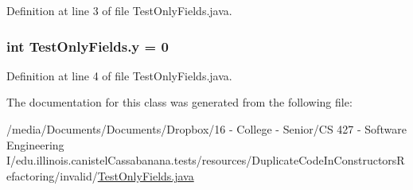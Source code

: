 Definition at line 3 of file TestOnlyFields.java.

\hypertarget{classTestOnlyFields_a0de494a2542663d26451138724b0e0ac}{
\subsubsection[{y}]{\setlength{\rightskip}{0pt plus 5cm}int {\bf TestOnlyFields.y} = 0}}
\label{classTestOnlyFields_a0de494a2542663d26451138724b0e0ac}


Definition at line 4 of file TestOnlyFields.java.



The documentation for this class was generated from the following file:\begin{DoxyCompactItemize}
\item 
/media/Documents/Documents/Dropbox/16 -\/ College -\/ Senior/CS 427 -\/ Software Engineering I/edu.illinois.canistelCassabanana.tests/resources/DuplicateCodeInConstructorsRefactoring/invalid/\hyperlink{TestOnlyFields_8java}{TestOnlyFields.java}\end{DoxyCompactItemize}
